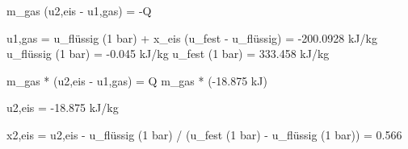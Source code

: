 m_gas (u2,eis - u1,gas) = -Q  

u1,gas = u_flüssig (1 bar) + x_eis (u_fest - u_flüssig) = -200.0928 kJ/kg  
u_flüssig (1 bar) = -0.045 kJ/kg  
u_fest (1 bar) = 333.458 kJ/kg  

m_gas * (u2,eis - u1,gas) = Q  
m_gas * (-18.875 kJ)  

u2,eis = -18.875 kJ/kg  

x2,eis = u2,eis - u_flüssig (1 bar) / (u_fest (1 bar) - u_flüssig (1 bar)) = 0.566